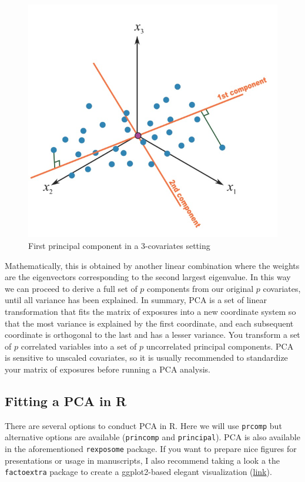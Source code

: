 \documentclass[
]{book}
\begin{document}
\begin{figure}
\centering
\includegraphics{images/pca2.png}
\caption{First principal component in a 3-covariates setting}
\end{figure}

Mathematically, this is obtained by another linear combination where the weights are the eigenvectors corresponding to the second largest eigenvalue. In this way we can proceed to derive a full set of \(p\) components from our original \(p\) covariates, until all variance has been explained. In summary, PCA is a set of linear transformation that fits the matrix of exposures into a new coordinate system so that the most variance is explained by the first coordinate, and each subsequent coordinate is orthogonal to the last and has a lesser variance. You transform a set of \(p\) correlated variables into a set of \(p\) uncorrelated principal components. PCA is sensitive to unscaled covariates, so it is usually recommended to standardize your matrix of exposures before running a PCA analysis.

\hypertarget{fitting-a-pca-in-r}{%
\subsection{Fitting a PCA in R}\label{fitting-a-pca-in-r}}

There are several options to conduct PCA in R. Here we will use \texttt{prcomp} but alternative options are available (\texttt{princomp} and \texttt{principal}). PCA is also available in the aforementioned \texttt{rexposome} package. If you want to prepare nice figures for presentations or usage in manuscripts, I also recommend taking a look a the \texttt{factoextra} package to create a ggplot2-based elegant visualization (\href{http://www.sthda.com/english/wiki/factoextra-r-package-easy-multivariate-data-analyses-and-elegant-visualization}{link}).
\end{document}
